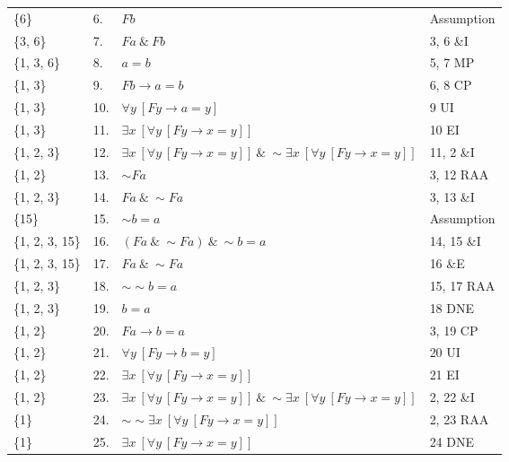 \documentclass[a4paper,12pt]{article}
\newcommand{\ra}{\rightarrow}
\newcommand{\s}{\sim}
\newcommand{\ta}{ \ \& \ }
\newcommand{\all}{\forall}
\newcommand{\ex}{\exists}
\begin{document}
\begin{enumerate}[label=\arabic*,leftmargin=*]
\begin{enumerate}[label=\arabic*.,start=10]
\begin{minipage}{\textwidth}
\begin{tabular}{l l l l}
                        \{6\}           &  6. & $Fb$ & Assumption\\
                        \{3, 6\}        &  7. & $Fa \ta Fb$ & 3, 6 \&I\\
                        \{1, 3, 6\}     &  8. & $a=b$ & 5, 7 MP\\
                        \{1, 3\}        &  9. & $Fb \ra a=b$ & 6, 8 CP\\
                        \{1, 3\}        & 10. & $\all y \ [Fy \ra a=y]$ & 9 UI\\
                        \{1, 3\}        & 11. & $\ex x \ [\all y \ [Fy \ra x=y]]$ & 10 EI\\
                        \{1, 2, 3\}     & 12. & $\ex x \ [\all y \ [Fy \ra x=y]] \ta \s \ex x \ [\all y \ [Fy \ra x=y]]$ & 11, 2 \&I\\
                        \{1, 2\}        & 13. & $\s Fa$ & 3, 12 RAA\\
                        \{1, 2, 3\}     & 14. & $Fa \ta \s Fa$ & 3, 13 \&I\\
                        \{15\}          & 15. & $\s b=a$ & Assumption\\
                        \{1, 2, 3, 15\} & 16. & $(Fa \ta \s Fa) \ta \s b=a$ & 14, 15 \&I\\
                        \{1, 2, 3, 15\} & 17. & $Fa \ta \s Fa$ & 16 \&E\\
                        \{1, 2, 3\}     & 18. & $\s \s b=a$ & 15, 17 RAA\\
                        \{1, 2, 3\}     & 19. & $b=a$ & 18 DNE\\
                        \{1, 2\}        & 20. & $Fa \ra b=a$ & 3, 19 CP\\
                        \{1, 2\}        & 21. & $\all y \ [Fy \ra b=y]$ & 20 UI\\
                        \{1, 2\}        & 22. & $\ex x \ [\all y \ [Fy \ra x=y]]$ & 21 EI\\
                        \{1, 2\}        & 23. & $\ex x \ [\all y \ [Fy \ra x=y]] \ta \s \ex x \ [\all y \ [Fy \ra x=y]]$ & 2, 22 \&I\\
                        \{1\}           & 24. & $\s \s \ex x \ [\all y \ [Fy \ra x=y]]$ & 2, 23 RAA\\
                        \{1\}           & 25. & $\ex x \ [\all y \ [Fy \ra x=y]]$ & 24 DNE\\
                    \end{tabular}
                    \vspace{1em}
                \end{minipage}
            \end{enumerate}

    \end{enumerate}
\end{document}
